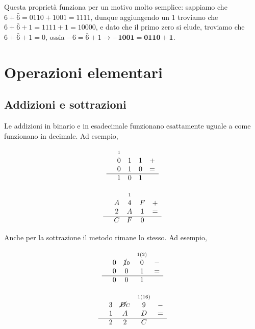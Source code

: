 \documentclass[11pt, a4paper, titlepage, oneside]{scrbook}
\begin{document}
Questa proprietà funziona per un motivo molto semplice: sappiamo che $6 + \bar{6} = 0110 + 1001 = 1111$, dunque aggiungendo un 1 troviamo che $6 + \bar{6} + 1 = 1111 + 1 = 10000$, e dato che il primo zero si elude, troviamo che $6 + \bar{6} + 1 = 0$, ossia $-6 = \bar{6} + 1 \longrightarrow \bm{-1001 = 0110 + 1}$.  

\section{Operazioni elementari}

\subsection{Addizioni e sottrazioni}

Le addizioni in binario e in esadecimale funzionano esattamente uguale a come funzionano in decimale. Ad esempio,

\noindent
\begin{minipage}{0.48\textwidth}
\[
\begin{array}{rcccc}
& \scriptstyle 1 & & & \\
& 0 & 1 & 1 & + \\
& 0 & 1 & 0 & = \\
\hline
& 1 & 0 & 1 &
\end{array}
\]
\end{minipage}\hfill
\begin{minipage}{0.48\textwidth}
\[
\begin{array}{rcccc}
& & \scriptstyle 1 & & \\
& A & 4 & F & + \\
& 2 & A & 1 & = \\
\hline
& C & F & 0 &
\end{array}
\]
\end{minipage}

Anche per la sottrazione il metodo rimane lo stesso. Ad esempio,

\noindent
\begin{minipage}{0.48\textwidth}
\[
\begin{array}{rcccc}
& & & \scriptstyle 1 (2) & \\
& 0 & \cancel{1} \scriptstyle 0 & 0 & - \\
& 0 & 0 & 1 & = \\
\hline
& 0 & 0 & 1 &
\end{array}
\]
\end{minipage}\hfill
\begin{minipage}{0.48\textwidth}
\[
\begin{array}{rcccc}
& & & \scriptstyle 1 (16) & \\
& 3 & \cancel{D} \scriptstyle C & 9 & - \\
& 1 & A & D & = \\
\hline
& 2 & 2 & C &
\end{array}
\]
\end{minipage}
\end{document}
